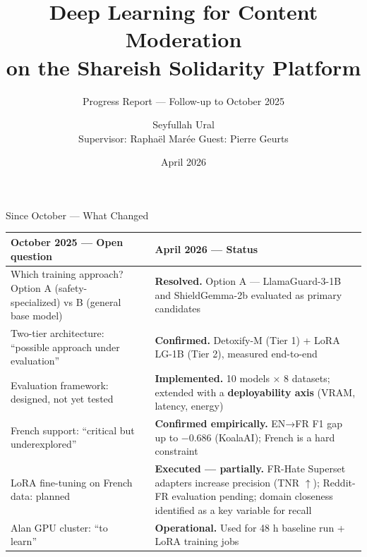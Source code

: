 \documentclass[aspectratio=169, 12pt]{beamer}
\title{Deep Learning for Content Moderation\\on the Shareish Solidarity Platform}
\subtitle{Progress Report — Follow-up to October 2025}
\author{Seyfullah Ural\\[4pt]\small Supervisor: Raphaël Marée \quad Guest: Pierre Geurts}
\institute{University of Liège}
\date{April 2026}
\newcommand{\good}[1]{\textcolor{okgreen}{\textbf{#1}}}
\newcommand{\warn}[1]{\textcolor{warnorange}{\textbf{#1}}}
\begin{document}
\maketitle

\begin{frame}[shrink=25]{Since October — What Changed}
  \small
  \begin{tabular}{p{} p{} p{}}
    \textbf{October 2025 — Open question} & & \textbf{April 2026 — Status} \\
    \midrule
    Which training approach? Option A (safety-specialized) vs B (general base model)
    & &
    \good{Resolved.} Option A — LlamaGuard-3-1B and ShieldGemma-2b evaluated as primary candidates \\[6pt]

    Two-tier architecture: ``possible approach under evaluation''
    & &
    \good{Confirmed.} Detoxify-M (Tier 1) + LoRA LG-1B (Tier 2), measured end-to-end \\[6pt]

    Evaluation framework: designed, not yet tested
    & &
    \good{Implemented.} 10 models × 8 datasets; extended with a \textbf{deployability axis} (VRAM, latency, energy) \\[6pt]

    French support: ``critical but underexplored''
    & &
    \good{Confirmed empirically.} EN→FR F1 gap up to $-$0.686 (KoalaAI); French is a hard constraint \\[6pt]

    LoRA fine-tuning on French data: planned
    & &
    \warn{Executed — partially.} FR-Hate Superset adapters increase precision (TNR $\uparrow$); Reddit-FR evaluation pending; domain closeness identified as a key variable for recall \\[6pt]

    Alan GPU cluster: ``to learn''
    & &
    \good{Operational.} Used for 48 h baseline run + LoRA training jobs \\
  \end{tabular}
\end{frame}
\end{document}
